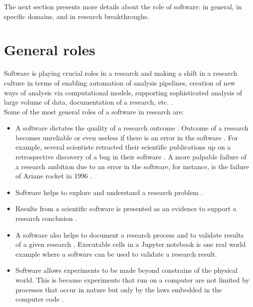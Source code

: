 The next section presents more details about the role of software: in general, in specific domains, and in research breakthroughs.


\section{General roles}
\label{sec:Roles:Generalroles}

Software is playing crucial roles in a research and making a shift in a research culture in terms of  enabling automation of analysis pipelines, creation of new ways of analysis via computational models, supporting sophisticated analysis of large volume of data, documentation of a research, etc. \citep{jay2020software}. \\

\noindent Some of the most general roles of a software in research are:

\begin{itemize}%
	\itemsep0em
	\item A software dictates the quality of a research outcome \citep{hannay2009scientists}. Outcome of a research becomes unreliable or even useless if there is an error in the software \citep{soergel2014rampant}. For example, several scientists retracted their scientific publications up on a retrospective discovery of a bug in their software \citep{wilson2014best,merali2010computational,miller2006scientist}. A more palpable failure of a research ambition due to an error in the software, for instance, is the failure of Ariane rocket in 1996 \citep{enwiki:1054482061}.  
	\item Software helps to explore and understand a research problem \citep{hannay2009scientists}.
	\item Results from a scientific software is presented as an evidence to support a research conclusion \citep{kanewala2014testing}. 
	
  
	
	\item A software also helps to document a research process and to validate results of a given research \citep{jay2020software}. Executable cells in a Jupyter notebook is one real world example where a software can be used to validate a research result.
	
	\item Software allows experiments to be made beyond constrains of the physical world. This is because experiments that run on a computer are not limited by processes that occur in nature but only by the laws embedded in the computer code \citep{wolfram1984computer}. 

\end{itemize}

